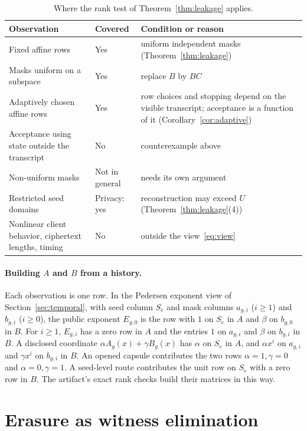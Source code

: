 \documentclass[pdflatex,sn-mathphys-num]{sn-jnl}%
\theoremstyle{plain}
\theoremstyle{definition}
\begin{document}
\begin{table}[t]
\caption{Where the rank test of Theorem~\ref{thm:leakage} applies.}\label{tab:rankscope}
\centering\footnotesize
\begin{tabularx}{\linewidth}{@{}>{\raggedright\arraybackslash}p{.30\linewidth}>{\raggedright\arraybackslash}p{.12\linewidth}Y@{}}\toprule
Observation & Covered & Condition or reason\\\midrule
Fixed affine rows & Yes & uniform independent masks (Theorem~\ref{thm:leakage})\\
Masks uniform on a subspace & Yes & replace $B$ by $BC$\\
Adaptively chosen affine rows & Yes & row choices and stopping depend on the visible transcript; acceptance is a function of it (Corollary~\ref{cor:adaptive})\\
Acceptance using state outside the transcript & No & counterexample above\\
Non-uniform masks & Not in general & needs its own argument\\
Restricted seed domains & Privacy: yes & reconstruction may exceed $U$ (Theorem~\ref{thm:leakage}(4))\\
Nonlinear client behavior, ciphertext lengths, timing & No & outside the view~\eqref{eq:view}\\\bottomrule
\end{tabularx}
\end{table}

\paragraph{Building $A$ and $B$ from a history.}
Each observation is one row. In the Pedersen exponent view of Section~\ref{sec:temporal}, with seed column $S_e$ and mask columns $a_{g,i}$ ($i\ge1$) and $b_{g,i}$ ($i\ge0$), the public exponent $E_{g,0}$ is the row with $1$ on $S_e$ in $A$ and $\beta$ on $b_{g,0}$ in $B$. For $i\ge1$, $E_{g,i}$ has a zero row in $A$ and the entries $1$ on $a_{g,i}$ and $\beta$ on $b_{g,i}$ in $B$. A disclosed coordinate $\alpha A_g(x)+\gamma B_g(x)$ has $\alpha$ on $S_e$ in $A$, and $\alpha x^i$ on $a_{g,i}$ and $\gamma x^i$ on $b_{g,i}$ in $B$. An opened capsule contributes the two rows $\alpha=1,\gamma=0$ and $\alpha=0,\gamma=1$. A seed-level route contributes the unit row on $S_e$ with a zero row in $B$. The artifact's exact rank checks build their matrices in this way.


\section{Erasure as witness elimination}\label{sec:erasure}
\end{document}
